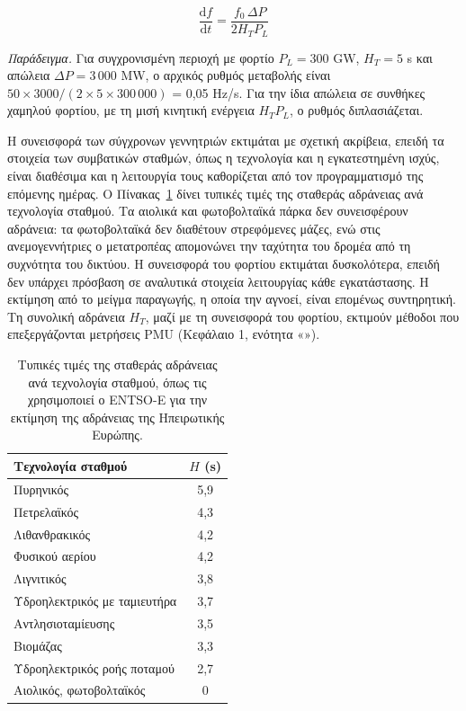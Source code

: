 \begin{equation}
\frac{\mathrm{d}f}{\mathrm{d}t} = \frac{f_0 \, \Delta P}{2 H_T P_L}
\label{eq:rocof}
\end{equation}

\emph{Παράδειγμα.} Για συγχρονισμένη περιοχή με φορτίο $P_L = 300$ GW, $H_T = 5$ s και απώλεια
$\Delta P = 3\,000$ MW, ο αρχικός ρυθμός μεταβολής είναι
$50 \times 3000 / (2 \times 5 \times 300\,000)$ = 0,05 Hz/s. Για την ίδια απώλεια σε συνθήκες
χαμηλού φορτίου, με τη μισή κινητική ενέργεια $H_T P_L$, ο ρυθμός διπλασιάζεται.

Η συνεισφορά των σύγχρονων γεννητριών εκτιμάται με σχετική ακρίβεια, επειδή τα στοιχεία των
συμβατικών σταθμών, όπως η τεχνολογία και η εγκατεστημένη ισχύς, είναι διαθέσιμα και η
λειτουργία τους καθορίζεται από τον προγραμματισμό της επόμενης ημέρας. Ο
Πίνακας~\ref{tab:hvalues} δίνει τυπικές τιμές της σταθεράς αδράνειας ανά τεχνολογία σταθμού.
Τα αιολικά και φωτοβολταϊκά πάρκα δεν συνεισφέρουν αδράνεια: τα φωτοβολταϊκά δεν διαθέτουν
στρεφόμενες μάζες, ενώ στις ανεμογεννήτριες ο μετατροπέας απομονώνει την ταχύτητα του δρομέα
από τη συχνότητα του δικτύου. Η συνεισφορά του φορτίου εκτιμάται δυσκολότερα, επειδή δεν
υπάρχει πρόσβαση σε αναλυτικά στοιχεία λειτουργίας κάθε εγκατάστασης. Η εκτίμηση από το μείγμα
παραγωγής, η οποία την αγνοεί, είναι επομένως συντηρητική. Τη συνολική αδράνεια $H_T$, μαζί με
τη συνεισφορά του φορτίου, εκτιμούν μέθοδοι που επεξεργάζονται μετρήσεις PMU (Κεφάλαιο 1,
ενότητα «»).

\begin{table}[!htbp]
\centering
\begin{tabular}{lc}
\hline
Τεχνολογία σταθμού & $H$ (s) \\
\hline
Πυρηνικός                    & 5,9 \\
Πετρελαϊκός                  & 4,3 \\
Λιθανθρακικός                & 4,2 \\
Φυσικού αερίου               & 4,2 \\
Λιγνιτικός                   & 3,8 \\
Υδροηλεκτρικός με ταμιευτήρα & 3,7 \\
Αντλησιοταμίευσης            & 3,5 \\
Βιομάζας                     & 3,3 \\
Υδροηλεκτρικός ροής ποταμού  & 2,7 \\
Αιολικός, φωτοβολταϊκός      & 0   \\
\hline
\end{tabular}
\caption{Τυπικές τιμές της σταθεράς αδράνειας ανά τεχνολογία σταθμού, όπως τις χρησιμοποιεί ο
ENTSO-E για την εκτίμηση της αδράνειας της Ηπειρωτικής Ευρώπης.}
\label{tab:hvalues}
\end{table}

